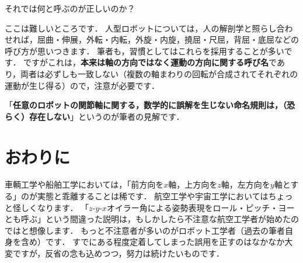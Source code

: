 ﻿\documentclass[a4paper]{jsarticle}
\begin{document}
それでは何と呼ぶのが正しいのか？

ここは難しいところです．
人型ロボットについては，人の解剖学と照らし合わせれば，屈曲・伸展，外転・内転，外旋・内旋，撓屈・尺屈，背屈・底屈などの呼び方が思いつきます．
筆者も，習慣としてはこれらを採用することが多いです．
ですがこれは，{\bf 本来は軸の方向ではなく運動の方向に関する呼び名}であり，両者は必ずしも一致しない（複数の軸まわりの回転が合成されてそれぞれの運動が生じ得る）ので，注意が必要です．

「{\bf 任意のロボットの関節軸に関する，数学的に誤解を生じない命名規則は，（恐らく）存在しない}」というのが筆者の見解です．



\section{おわりに}

車輌工学や船舶工学においては，「前方向を$x$軸，上方向を$z$軸，左方向を$y$軸とする」のが実態と乖離することは稀です．
航空工学や宇宙工学においてはちょっと怪しくなります．
「$z$-$y$-$x$オイラー角による姿勢表現をロール・ピッチ・ヨーとも呼ぶ」という間違った説明は，もしかしたら不注意な航空工学者が始めたのではと想像します．
もっと不注意者が多いのがロボット工学者（過去の筆者自身を含め）です．
すでにある程度定着してしまった誤用を正すのはなかなか大変ですが，反省の念も込めつつ，努力は続けたいものです．
\end{document}
